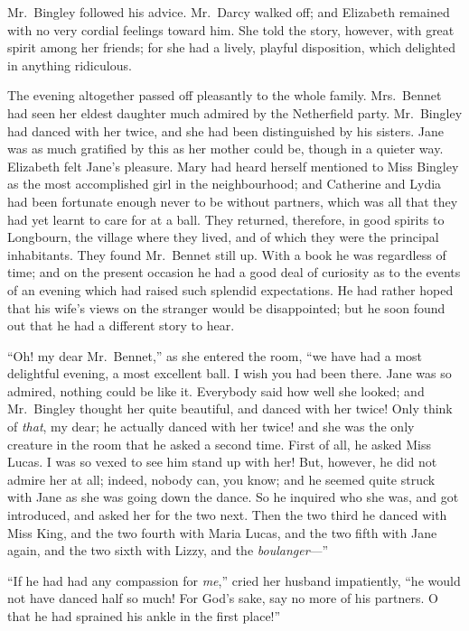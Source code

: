 Mr.\ Bingley followed his advice.  Mr.\ Darcy walked off; and
Elizabeth remained with no very cordial feelings toward him.
She told the story, however, with great spirit among her friends;
for she had a lively, playful disposition, which delighted in
anything ridiculous.

The evening altogether passed off pleasantly to the whole
family.  Mrs.\ Bennet had seen her eldest daughter much
admired by the Netherfield party.  Mr.\ Bingley had danced with
her twice, and she had been distinguished by his sisters.  Jane
was as much gratified by this as her mother could be, though in
a quieter way.  Elizabeth felt Jane's pleasure.  Mary had heard
herself mentioned to Miss Bingley as the most accomplished
girl in the neighbourhood; and Catherine and Lydia had been
fortunate enough never to be without partners, which was all
that they had yet learnt to care for at a ball.  They returned,
therefore, in good spirits to Longbourn, the village where they
lived, and of which they were the principal inhabitants.  They
found Mr.\ Bennet still up.  With a book he was regardless of
time; and on the present occasion he had a good deal of
curiosity as to the events of an evening which had raised such
splendid expectations.  He had rather hoped that his wife's
views on the stranger would be disappointed; but he soon
found out that he had a different story to hear.

``Oh! my dear Mr.\ Bennet,'' as she entered the room, ``we have
had a most delightful evening, a most excellent ball.  I wish you
had been there.  Jane was so admired, nothing could be like it.
Everybody said how well she looked; and Mr.\ Bingley thought
her quite beautiful, and danced with her twice!  Only think of
\emph{that}, my dear; he actually danced with her twice! and she was
the only creature in the room that he asked a second time.
First of all, he asked Miss Lucas.  I was so vexed to see him
stand up with her!  But, however, he did not admire her at all;
indeed, nobody can, you know; and he seemed quite struck with
Jane as she was going down the dance.  So he inquired who she
was, and got introduced, and asked her for the two next.  Then
the two third he danced with Miss King, and the two fourth with
Maria Lucas, and the two fifth with Jane again, and the two
sixth with Lizzy, and the \emph{boulanger}---''

``If he had had any compassion for \emph{me},'' cried her husband
impatiently, ``he would not have danced half so much!  For God's
sake, say no more of his partners.  O that he had sprained
his ankle in the first place!''


